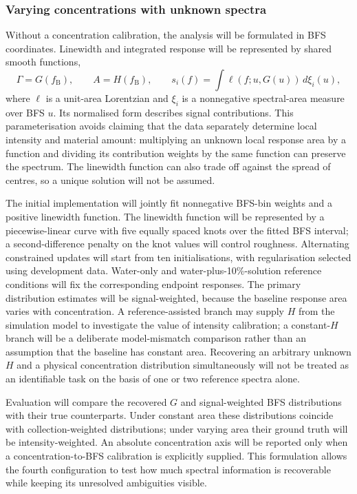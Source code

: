 \documentclass[11pt]{article}
\begin{document}
\subsubsection{Varying concentrations with unknown spectra}

Without a concentration calibration, the analysis will be formulated in BFS coordinates. Linewidth and integrated response will be represented by shared smooth functions,
\begin{equation}
 \Gamma=G(f_{\mathrm B}),\qquad A=H(f_{\mathrm B}),\qquad
 s_i(f)=\int \ell(f;u,G(u))\,d\xi_i(u),
 \label{eq:unknown_family}
\end{equation}
where $\ell$ is a unit-area Lorentzian and $\xi_i$ is a nonnegative spectral-area measure over BFS $u$. Its normalised form describes signal contributions. This parameterisation avoids claiming that the data separately determine local intensity and material amount: multiplying an unknown local response area by a function and dividing its contribution weights by the same function can preserve the spectrum. The linewidth function can also trade off against the spread of centres, so a unique solution will not be assumed.

The initial implementation will jointly fit nonnegative BFS-bin weights and a positive linewidth function. The linewidth function will be represented by a piecewise-linear curve with five equally spaced knots over the fitted BFS interval; a second-difference penalty on the knot values will control roughness. Alternating constrained updates will start from ten initialisations, with regularisation selected using development data. Water-only and water-plus-10\%-solution reference conditions will fix the corresponding endpoint responses. The primary distribution estimates will be signal-weighted, because the baseline response area varies with concentration. A reference-assisted branch may supply $H$ from the simulation model to investigate the value of intensity calibration; a constant-$H$ branch will be a deliberate model-mismatch comparison rather than an assumption that the baseline has constant area. Recovering an arbitrary unknown $H$ and a physical concentration distribution simultaneously will not be treated as an identifiable task on the basis of one or two reference spectra alone.

Evaluation will compare the recovered $G$ and signal-weighted BFS distributions with their true counterparts. Under constant area these distributions coincide with collection-weighted distributions; under varying area their ground truth will be intensity-weighted. An absolute concentration axis will be reported only when a concentration-to-BFS calibration is explicitly supplied. This formulation allows the fourth configuration to test how much spectral information is recoverable while keeping its unresolved ambiguities visible.
\end{document}
